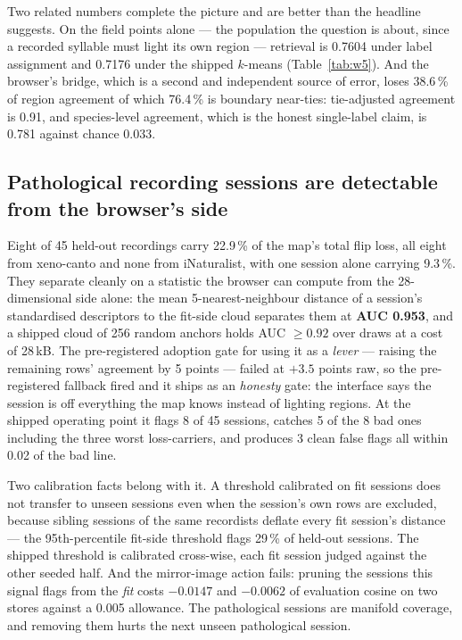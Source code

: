 \documentclass[10pt,twocolumn,a4paper]{article}
\begin{document}
Two related numbers complete the picture and are better than the headline suggests. On the
field points alone --- the population the question is about, since a recorded syllable must
light its own region --- retrieval is 0.7604 under label assignment and 0.7176 under the
shipped $k$-means (Table~\ref{tab:w5}). And the browser's bridge, which is a second and
independent source of error, loses 38.6\,\% of region agreement of which 76.4\,\% is boundary
near-ties: tie-adjusted agreement is 0.91, and species-level agreement, which is the honest
single-label claim, is 0.781 against chance 0.033.

\subsection{Pathological recording sessions are detectable from the browser's side}

Eight of 45 held-out recordings carry 22.9\,\% of the map's total flip loss, all eight from
xeno-canto and none from iNaturalist, with one session alone carrying 9.3\,\%. They separate
cleanly on a statistic the browser can compute from the 28-dimensional side alone: the mean
5-nearest-neighbour distance of a session's standardised descriptors to the fit-side cloud
separates them at \textbf{AUC 0.953}, and a shipped cloud of 256 random anchors holds
AUC $\ge 0.92$ over draws at a cost of 28\,kB. The pre-registered adoption gate for using it
as a \emph{lever} --- raising the remaining rows' agreement by 5 points --- failed at $+3.5$
points raw, so the pre-registered fallback fired and it ships as an \emph{honesty} gate: the
interface says the session is off everything the map knows instead of lighting regions. At
the shipped operating point it flags 8 of 45 sessions, catches 5 of the 8 bad ones including
the three worst loss-carriers, and produces 3 clean false flags all within 0.02 of the bad
line.

Two calibration facts belong with it. A threshold calibrated on fit sessions does not
transfer to unseen sessions even when the session's own rows are excluded, because sibling
sessions of the same recordists deflate every fit session's distance --- the 95th-percentile
fit-side threshold flags 29\,\% of held-out sessions. The shipped threshold is calibrated
cross-wise, each fit session judged against the other seeded half. And the mirror-image
action fails: pruning the sessions this signal flags from the \emph{fit} costs $-0.0147$ and
$-0.0062$ of evaluation cosine on two stores against a 0.005 allowance. The pathological
sessions are manifold coverage, and removing them hurts the next unseen pathological session.
\end{document}
